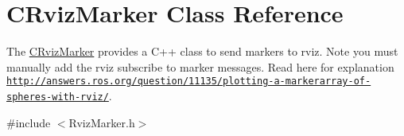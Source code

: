 \hypertarget{classCRvizMarker}{\section{C\-Rviz\-Marker Class Reference}
\label{classCRvizMarker}
}


The \hyperlink{classCRvizMarker}{C\-Rviz\-Marker} provides a C++ class to send markers to rviz. Note you must manually add the rviz subscribe to marker messages. Read here for explanation \href{http://answers.ros.org/question/11135/plotting-a-markerarray-of-spheres-with-rviz/}{\tt http\-://answers.\-ros.\-org/question/11135/plotting-\/a-\/markerarray-\/of-\/spheres-\/with-\/rviz/}.  




{\ttfamily \#include $<$Rviz\-Marker.\-h$>$}

